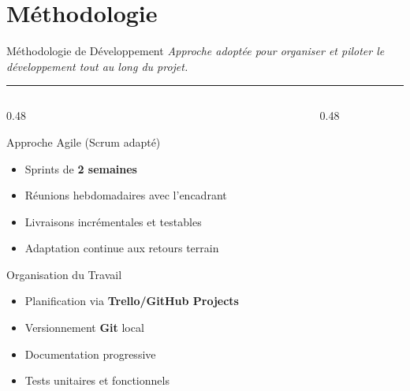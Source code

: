 \documentclass[
  aspectratio=169,       %
  xcolor=dvipsnames,     %
  t                      %
]{beamer}
\newcommand{\framedesc}[1]{%
  {\small\itshape\textcolor{PrimaryDark!80}{#1}}\par%
  \vspace{1pt}%
  {\color{PrimaryMid}\rule{\textwidth}{0.4pt}}%
  \vspace{4pt}%
}
\begin{document}
\section{Méthodologie}

\begin{frame}{Méthodologie de Développement}
  \framedesc{Approche adoptée pour organiser et piloter le développement tout au long du projet.}

  \begin{columns}[T]

    \begin{column}{0.48\textwidth}
      \begin{block}{Approche Agile (Scrum adapté)}
        \begin{itemize}
          \item Sprints de \textbf{2 semaines}
          \item Réunions hebdomadaires avec l'encadrant
          \item Livraisons incrémentales et testables
          \item Adaptation continue aux retours terrain
        \end{itemize}
      \end{block}

      \vspace{0.3cm}

      \begin{block}{Organisation du Travail}
        \begin{itemize}
          \item Planification via \textbf{Trello/GitHub Projects}
          \item Versionnement \textbf{Git} local
          \item Documentation progressive
          \item Tests unitaires et fonctionnels
        \end{itemize}
      \end{block}
    \end{column}

    \begin{column}{0.48\textwidth}
      \begin{center}
\end{center}
\end{column}
\end{columns}
\end{frame}
\end{document}
